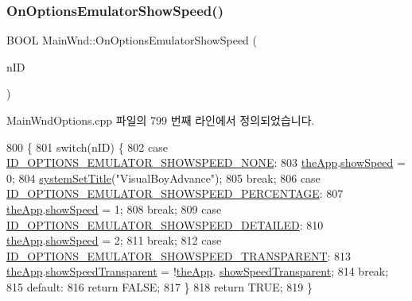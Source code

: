 \subsubsection{\texorpdfstring{On\+Options\+Emulator\+Show\+Speed()}{OnOptionsEmulatorShowSpeed()}}
{\footnotesize\ttfamily B\+O\+OL Main\+Wnd\+::\+On\+Options\+Emulator\+Show\+Speed (\begin{DoxyParamCaption}\item[{U\+I\+NT}]{n\+ID }\end{DoxyParamCaption})}



Main\+Wnd\+Options.\+cpp 파일의 799 번째 라인에서 정의되었습니다.


\begin{DoxyCode}
800 \{
801   \textcolor{keywordflow}{switch}(nID) \{
802   \textcolor{keywordflow}{case} \mbox{\hyperlink{resource_8h_a451fc737b7bded73e0c88477770c6d9c}{ID\_OPTIONS\_EMULATOR\_SHOWSPEED\_NONE}}:
803     \mbox{\hyperlink{_v_b_a_8cpp_a8095a9d06b37a7efe3723f3218ad8fb3}{theApp}}.\mbox{\hyperlink{class_v_b_a_ad86589d0d03fceef36d35c0b2e928e9e}{showSpeed}} = 0;
804     \mbox{\hyperlink{system_8cpp_a154a393a2a25c1681855dc5fe4545b68}{systemSetTitle}}(\textcolor{stringliteral}{"VisualBoyAdvance"});
805     \textcolor{keywordflow}{break};
806   \textcolor{keywordflow}{case} \mbox{\hyperlink{resource_8h_a229afc2f5ae1609aea580e0dbd7f8293}{ID\_OPTIONS\_EMULATOR\_SHOWSPEED\_PERCENTAGE}}:
807     \mbox{\hyperlink{_v_b_a_8cpp_a8095a9d06b37a7efe3723f3218ad8fb3}{theApp}}.\mbox{\hyperlink{class_v_b_a_ad86589d0d03fceef36d35c0b2e928e9e}{showSpeed}} = 1;
808     \textcolor{keywordflow}{break};
809   \textcolor{keywordflow}{case} \mbox{\hyperlink{resource_8h_abc01a85f7ca68082b809b0e166b00fdd}{ID\_OPTIONS\_EMULATOR\_SHOWSPEED\_DETAILED}}:
810     \mbox{\hyperlink{_v_b_a_8cpp_a8095a9d06b37a7efe3723f3218ad8fb3}{theApp}}.\mbox{\hyperlink{class_v_b_a_ad86589d0d03fceef36d35c0b2e928e9e}{showSpeed}} = 2;
811     \textcolor{keywordflow}{break};
812   \textcolor{keywordflow}{case} \mbox{\hyperlink{resource_8h_ac4eb3ce376b2308402f4763f606b55df}{ID\_OPTIONS\_EMULATOR\_SHOWSPEED\_TRANSPARENT}}:
813     \mbox{\hyperlink{_v_b_a_8cpp_a8095a9d06b37a7efe3723f3218ad8fb3}{theApp}}.\mbox{\hyperlink{class_v_b_a_a0a2ca5a7091f9c79b39ea0916dd88a05}{showSpeedTransparent}} = !\mbox{\hyperlink{_v_b_a_8cpp_a8095a9d06b37a7efe3723f3218ad8fb3}{theApp}}.
      \mbox{\hyperlink{class_v_b_a_a0a2ca5a7091f9c79b39ea0916dd88a05}{showSpeedTransparent}};
814     \textcolor{keywordflow}{break};
815   \textcolor{keywordflow}{default}:
816     \textcolor{keywordflow}{return} FALSE;
817   \}
818   \textcolor{keywordflow}{return} TRUE;
819 \}
\end{DoxyCode}
